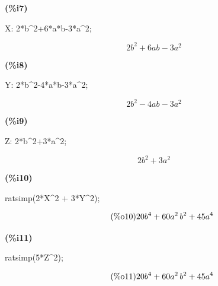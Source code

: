 \documentclass[11pt]{amsart}
\begin{document}
\noindent
\begin{minipage}[t]{8ex}\color{red}\bf
(\%{}i7) 
\end{minipage}
\begin{minipage}[t]{\textwidth}\color{blue}
X: 2*b\^{}2+6*a*b-3*a\^{}2;
\end{minipage}
\[\displaystyle
\tag{X}\label{X}
2{{b}^{2}}+6ab-3{{a}^{2}}\mbox{}
\]


\noindent
\begin{minipage}[t]{8ex}\color{red}\bf
(\%{}i8) 
\end{minipage}
\begin{minipage}[t]{\textwidth}\color{blue}
Y: 2*b\^{}2-4*a*b-3*a\^{}2;
\end{minipage}
\[\displaystyle
\tag{Y}\label{Y}
2{{b}^{2}}-4ab-3{{a}^{2}}\mbox{}
\]


\noindent
\begin{minipage}[t]{8ex}\color{red}\bf
(\%{}i9) 
\end{minipage}
\begin{minipage}[t]{\textwidth}\color{blue}
Z: 2*b\^{}2+3*a\^{}2;
\end{minipage}
\[\displaystyle
\tag{Z}\label{Z}
2{{b}^{2}}+3{{a}^{2}}\mbox{}
\]


\noindent
\begin{minipage}[t]{8ex}\color{red}\bf
(\%{}i10) 
\end{minipage}
\begin{minipage}[t]{\textwidth}\color{blue}
ratsimp(2*X\^{}2 + 3*Y\^{}2);
\end{minipage}
\[\displaystyle
\tag{\%{}o10}\label{o10} 
20{{b}^{4}}+60{{a}^{2}}\,{{b}^{2}}+45{{a}^{4}}\mbox{}
\]


\noindent
\begin{minipage}[t]{8ex}\color{red}\bf
(\%{}i11) 
\end{minipage}
\begin{minipage}[t]{\textwidth}\color{blue}
ratsimp(5*Z\^{}2);
\end{minipage}
\[\displaystyle
\tag{\%{}o11}\label{o11} 
20{{b}^{4}}+60{{a}^{2}}\,{{b}^{2}}+45{{a}^{4}}\mbox{}
\]
\end{document}
